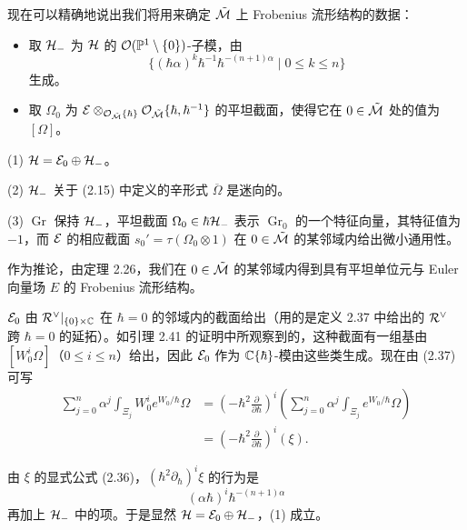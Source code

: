 现在可以精确地说出我们将用来确定 $\tilde{\mathcal{M}}$ 上 Frobenius 流形结构的数据：
\begin{itemize}[leftmargin=1.6em,itemsep=2pt]
\item 取 $\mathcal{H}_-$ 为 $\mathcal{H}$ 的 $\mathcal{O}(\mathbb{P}^{1}\setminus\{0\})$-子模，由
  \[
    \bigl\{(\hbar\alpha)^{k}\hbar^{-1}\hbar^{-(n+1)\alpha}\mid 0\le k\le n\bigr\}
  \]
  生成。
\item 取 $\Omega_0$ 为 $\mathcal{E}\otimes_{\mathcal{O}_{\tilde{\mathcal{M}}}\{\hbar\}}\mathcal{O}_{\tilde{\mathcal{M}}}\{\hbar,\hbar^{-1}\}$ 的平坦截面，使得它在 $0\in\tilde{\mathcal{M}}$ 处的值为 $[\Omega]$。
\end{itemize}

\begin{proposition}
(1) $\mathcal{H}=\mathcal{E}_0\oplus\mathcal{H}_-$。

(2) $\mathcal{H}_-$ 关于 (2.15) 中定义的辛形式 $\overline{\Omega}$ 是迷向的。

(3) $\operatorname{Gr}$ 保持 $\mathcal{H}_-$，平坦截面 $\Omega_0\in\hbar\mathcal{H}_-$ 表示 $\operatorname{Gr}_0$ 的一个特征向量，其特征值为 $-1$，而 $\mathcal{E}$ 的相应截面 $s_0'=\tau(\Omega_0\otimes1)$ 在 $0\in\tilde{\mathcal{M}}$ 的某邻域内给出微小通用性。
\end{proposition}

作为推论，由定理 2.26，我们在 $0\in\tilde{\mathcal{M}}$ 的某邻域内得到具有平坦单位元与 Euler 向量场 $E$ 的 Frobenius 流形结构。

$\mathcal{E}_0$ 由 $\mathcal{R}^\vee|_{\{0\}\times\mathbb{C}}$ 在 $\hbar=0$ 的邻域内的截面给出（用的是定义 2.37 中给出的 $\mathcal{R}^\vee$ 跨 $\hbar=0$ 的延拓）。如引理 2.41 的证明中所观察到的，这种截面有一组基由 $[W_0^{i}\Omega]$（$0\le i\le n$）给出，因此 $\mathcal{E}_0$ 作为 $\mathbb{C}\{\hbar\}$-模由这些类生成。现在由 (2.37) 可写
\begin{align*}
  \sum_{j=0}^{n}\alpha^{j}\int_{\Xi_j}W_0^{i}e^{W_0/\hbar}\Omega
  &=\left(-\hbar^{2}\frac{\partial}{\partial\hbar}\right)^{i}
  \left(\sum_{j=0}^{n}\alpha^{j}\int_{\Xi_j}e^{W_0/\hbar}\Omega\right)\\
  &=\left(-\hbar^{2}\frac{\partial}{\partial\hbar}\right)^{i}(\xi).
\end{align*}

由 $\xi$ 的显式公式 (2.36)，$(\hbar^{2}\partial_\hbar)^{i}\xi$ 的行为是
\[
  (\alpha\hbar)^{i}\hbar^{-(n+1)\alpha}
\]
再加上 $\mathcal{H}_-$ 中的项。于是显然 $\mathcal{H}=\mathcal{E}_0\oplus\mathcal{H}_-$，(1) 成立。

